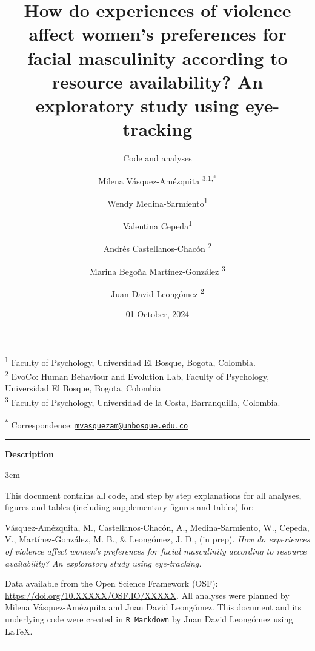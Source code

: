 \documentclass[
  bookmarksnumbered]{article}
\title{How do experiences of violence affect women's preferences for facial masculinity according to resource availability? An exploratory study using eye-tracking}
\subtitle{Code and analyses}
\author{Milena Vásquez-Amézquita \orcidlink{0000-0001-7317-8430}\textsuperscript{3,1,*} \and Wendy Medina-Sarmiento\textsuperscript{1} \and Valentina Cepeda\textsuperscript{1} \and Andrés Castellanos-Chacón \orcidlink{0000-0003-1684-9319}\textsuperscript{2} \and Marina Begoña Martínez-González \orcidlink{0000-0002-5840-6383}\textsuperscript{3} \and Juan David Leongómez \orcidlink{0000-0002-0092-6298}\textsuperscript{2}}
\date{01 October, 2024}
\begin{document}
\maketitle

\textsuperscript{1} Faculty of Psychology, Universidad El Bosque, Bogota, Colombia.\\
\textsuperscript{2} EvoCo: Human Behaviour and Evolution Lab, Faculty of Psychology, Universidad El Bosque, Bogota, Colombia\\
\textsuperscript{3} Faculty of Psychology, Universidad de la Costa, Barranquilla, Colombia.

\textsuperscript{*} Correspondence: \href{mailto:mvasquezam@unbosque.edu.co}{\href{mailto:mvasquezam@unbosque.edu.co}{\nolinkurl{mvasquezam@unbosque.edu.co}}}

\begin{center}\rule{0.5\linewidth}{0.5pt}\end{center}

\begin{center}
\textbf{Description}
\end{center}

\par
\begingroup
\leftskip3em
\rightskip\leftskip

This document contains all code, and step by step explanations for all analyses, figures and tables (including supplementary figures and tables) for:

\begin{hangparas}{.25in}{1}
Vásquez-Amézquita, M., Castellanos-Chacón, A., Medina-Sarmiento, W., Cepeda, V., Martínez-González, M. B., \& Leongómez, J. D.,  (in prep). \textit{How do experiences of violence affect women's preferences for facial masculinity according to resource availability? An exploratory study using eye-tracking.}
\end{hangparas}

Data available from the Open Science Framework (OSF): \url{https://doi.org/10.XXXXX/OSF.IO/XXXXX}. All analyses were planned by Milena Vásquez-Amézquita and Juan David Leongómez. This document and its underlying code were created in \texttt{R\ Markdown} by Juan David Leongómez using \LaTeX.

\begin{center}\rule{0.5\linewidth}{0.5pt}\end{center}

\par
\endgroup

{\hypersetup{hidelinks}
\setcounter{tocdepth}{6}
\tableofcontents
}
\opensupplement
\end{document}
